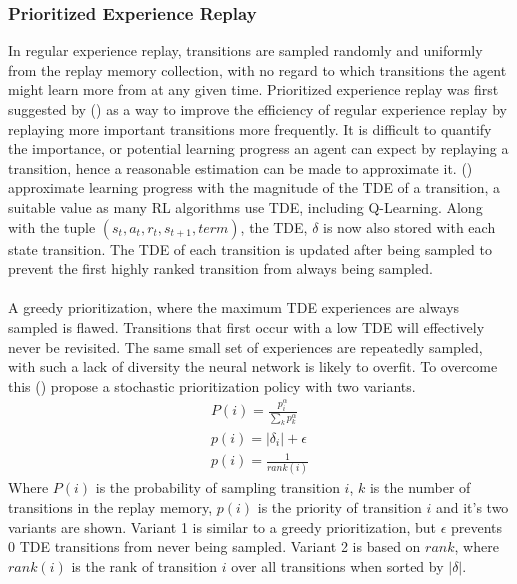 \subsubsection{Prioritized Experience Replay}
In regular experience replay, transitions are sampled randomly and uniformly from the replay memory collection, with no regard to which transitions the agent might learn more from at any given time. Prioritized experience replay was first suggested by (\citet{prioritized}) as a way to improve the efficiency of regular experience replay by replaying more important transitions more frequently. It is difficult to quantify the importance, or potential learning progress an agent can expect by replaying a transition, hence a reasonable estimation can be made to approximate it. (\citet{prioritized}) approximate learning progress with the magnitude of the TDE of a transition, a suitable value as many RL algorithms use TDE, including Q-Learning. Along with the tuple $(s_t, a_t, r_{t}, s_{t+1}, term)$, the TDE, $\delta$ is now also stored with each state transition. The TDE of each transition is updated after being sampled to prevent the first highly ranked transition from always being sampled. \paragraph{}

A greedy prioritization, where the maximum TDE experiences are always sampled is flawed. Transitions that first occur with a low TDE will effectively never be revisited. The same small set of experiences are repeatedly sampled, with such a lack of diversity the neural network is likely to overfit. To overcome this (\citet{prioritized}) propose a stochastic prioritization policy with two variants.
\begin{gather}
    \label{equ:prob_exp}
    P(i) = \frac{p_i^\alpha}{\sum_kp_k^\alpha} \\
    \label{equ:priority1}
    p(i) = |\delta_i| + \epsilon \\
    \label{equ:priority2}
    p(i) = \frac{1}{rank(i)}
\end{gather}
Where $P(i)$ is the probability of sampling transition $i$, $k$ is the number of transitions in the replay memory, $p(i)$ is the priority of transition $i$ and it's two variants are shown. Variant 1 is similar to a greedy prioritization, but $\epsilon$ prevents 0 TDE transitions from never being sampled. Variant 2 is based on $rank$, where $rank(i)$ is the rank of transition $i$ over all transitions when sorted by $|\delta|$.

